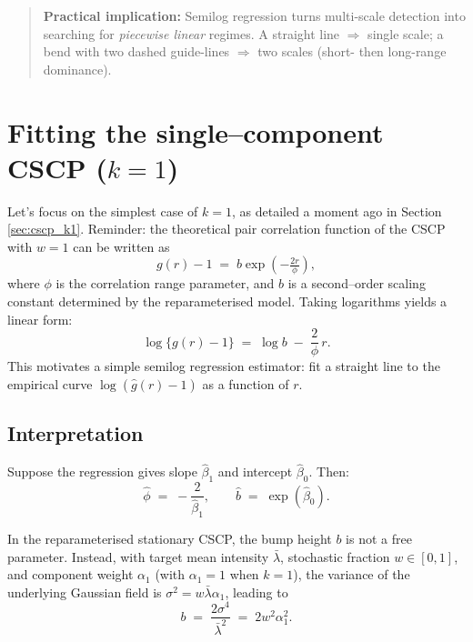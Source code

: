 \documentclass[11pt]{article}
\begin{document}
\begin{quote}
\begin{center}
	\end{center}
	
	\noindent\textbf{Practical implication:}  
	Semilog regression turns multi-scale detection into searching for \emph{piecewise linear} regimes.  
	A straight line $\Rightarrow$ single scale; a bend with two dashed guide-lines $\Rightarrow$ two scales (short- then long-range dominance).
\end{quote}

\section{Fitting the single--component CSCP ($k=1$)}

Let's focus on the simplest case of $k=1$, as detailed a moment ago in Section \ref{sec:cscp_k1}. Reminder: the theoretical pair correlation function of the CSCP with $w=1$ can be written as
\[
g(r) - 1 \;=\; b \exp\!\left(-\tfrac{2r}{\phi}\right),
\]
where $\phi$ is the correlation range parameter, and $b$ is a second--order scaling constant determined by the reparameterised model.  
Taking logarithms yields a linear form:
\[
\log\{g(r)-1\} \;=\; \log b \;-\;\frac{2}{\phi}\, r.
\]
This motivates a simple semilog regression estimator: fit a straight line to the empirical curve $\log(\hat g(r)-1)$ as a function of $r$.

\subsection{Interpretation}  
Suppose the regression gives slope $\hat\beta_1$ and intercept $\hat\beta_0$. Then:
\[
\hat{\phi} \;=\; -\frac{2}{\hat\beta_1}, 
\qquad 
\hat b \;=\; \exp(\hat\beta_0).
\]

In the reparameterised stationary CSCP, the bump height $b$ is not a free parameter. Instead, with target mean intensity $\bar\lambda$, stochastic fraction $w \in [0,1]$, and component weight $\alpha_1$ (with $\alpha_1=1$ when $k=1$), the variance of the underlying Gaussian field is $\sigma^2 = w\bar\lambda \alpha_1$, leading to
\[
b \;=\; \frac{2\sigma^4}{\bar\lambda^2}
\;=\; 2 w^2 \alpha_1^2.
\]
\end{document}
